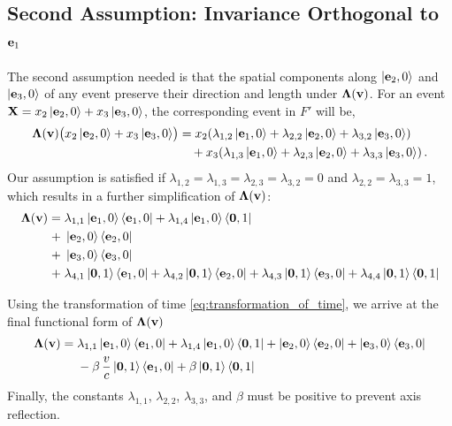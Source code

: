 \documentclass[12pt]{article}
\begin{document}
\subsection{Second Assumption: Invariance Orthogonal to $\vb{e}_1$}

The second assumption needed is that the spatial components along $\ket{\vb{e}_2,0}$ and
$\ket{\vb{e}_3,0}$ of any event preserve their direction and length under
$\boldsymbol{\Lambda}(\vb{v})$. For an event
$\vb{X} = x_2\ket{\vb{e}_2, 0} + x_3\ket{\vb{e}_3, 0}$, the corresponding event in $F'$
will be,
\begin{equation}
  \begin{aligned}
    \boldsymbol{\Lambda}(\vb{v})\bigl(x_2\ket{\vb{e}_2,0} + x_3\ket{\vb{e}_3,0}\bigr)
    &= x_2\!\left(
        \lambda_{1,2}\ket{\vb{e}_1,0}
      + \lambda_{2,2}\ket{\vb{e}_2,0}
      + \lambda_{3,2}\ket{\vb{e}_3,0}
    \right) \\
    &\quad + x_3\!\left(
        \lambda_{1,3}\ket{\vb{e}_1,0}
      + \lambda_{2,3}\ket{\vb{e}_2,0}
      + \lambda_{3,3}\ket{\vb{e}_3,0}
    \right).
  \end{aligned}
\end{equation}
Our assumption is satisfied if $\lambda_{1,2} = \lambda_{1,3} = \lambda_{2,3} = \lambda_{3,2}
= 0$ and $\lambda_{2,2} = \lambda_{3,3} = 1$, which results in a further simplification of
$\boldsymbol{\Lambda}(\vb{v})$:
\begin{equation}
  \begin{aligned}
    \boldsymbol{\Lambda}(\vb{v}) =\;
      &\lambda_{1,1}\ket{\vb{e}_1,0}\bra{\vb{e}_1,0}
      + \lambda_{1,4}\ket{\vb{e}_1,0}\bra{\vb{0},1} \\
    +\;&\ket{\vb{e}_2,0}\bra{\vb{e}_2,0} \\
    +\;&\ket{\vb{e}_3,0}\bra{\vb{e}_3,0} \\
    +\;&\lambda_{4,1}\ket{\vb{0},1}\bra{\vb{e}_1,0}
      + \lambda_{4,2}\ket{\vb{0},1}\bra{\vb{e}_2,0}
      + \lambda_{4,3}\ket{\vb{0},1}\bra{\vb{e}_3,0}
      + \lambda_{4,4}\ket{\vb{0},1}\bra{\vb{0},1}
  \end{aligned}
\end{equation}

Using the transformation of time \eqref{eq:transformation_of_time}, we arrive at the final
functional form of $\boldsymbol{\Lambda}(\vb{v})$
\begin{equation}
  \begin{aligned}
    \boldsymbol{\Lambda}(\vb{v}) =\;
      &\lambda_{1,1}\ket{\vb{e}_1,0}\bra{\vb{e}_1,0}
      + \lambda_{1,4}\ket{\vb{e}_1,0}\bra{\vb{0},1}
      + \ket{\vb{e}_2,0}\bra{\vb{e}_2,0}
      + \ket{\vb{e}_3,0}\bra{\vb{e}_3,0} \\
      &- \beta\,\frac{v}{c}\ket{\vb{0},1}\bra{\vb{e}_1,0}
      + \beta\ket{\vb{0},1}\bra{\vb{0},1}
  \end{aligned}
  \label{eq:simplified_Lorentz}
\end{equation}
Finally, the constants $\lambda_{1,1}$, $\lambda_{2,2}$, $\lambda_{3,3}$, and $\beta$ must be
positive to prevent axis reflection.
\end{document}
